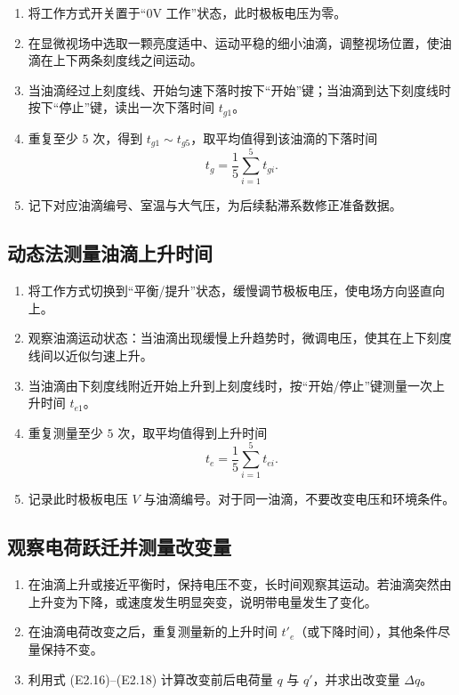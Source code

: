 \documentclass[a4paper,8pt,twocolumn]{article}
\begin{document}
\begin{enumerate}[label=\arabic*)]
  \item 将工作方式开关置于“0V 工作”状态，此时极板电压为零。
  \item 在显微视场中选取一颗亮度适中、运动平稳的细小油滴，调整视场位置，使油滴在上下两条刻度线之间运动。
  \item 当油滴经过上刻度线、开始匀速下落时按下“开始”键；当油滴到达下刻度线时按下“停止”键，读出一次下落时间 $t_{g1}$。
  \item 重复至少 $5$ 次，得到 $t_{g1}\sim t_{g5}$，取平均值得到该油滴的下落时间
  \[
    t_g=\frac{1}{5}\sum_{i=1}^{5}t_{gi}.
  \]
  \item 记下对应油滴编号、室温与大气压，为后续黏滞系数修正准备数据。
\end{enumerate}

\subsection{动态法测量油滴上升时间}

\begin{enumerate}[label=\arabic*)]
  \item 将工作方式切换到“平衡/提升”状态，缓慢调节极板电压，使电场方向竖直向上。
  \item 观察油滴运动状态：当油滴出现缓慢上升趋势时，微调电压，使其在上下刻度线间以近似匀速上升。
  \item 当油滴由下刻度线附近开始上升到上刻度线时，按“开始/停止”键测量一次上升时间 $t_{e1}$。
  \item 重复测量至少 $5$ 次，取平均值得到上升时间
  \[
    t_e=\frac{1}{5}\sum_{i=1}^{5}t_{ei}.
  \]
  \item 记录此时极板电压 $V$ 与油滴编号。对于同一油滴，不要改变电压和环境条件。
\end{enumerate}

\subsection{观察电荷跃迁并测量改变量}

\begin{enumerate}[label=\arabic*)]
  \item 在油滴上升或接近平衡时，保持电压不变，长时间观察其运动。若油滴突然由上升变为下降，或速度发生明显突变，说明带电量发生了变化。
  \item 在油滴电荷改变之后，重复测量新的上升时间 $t'_e$（或下降时间），其他条件尽量保持不变。
  \item 利用式 (E2.16)--(E2.18) 计算改变前后电荷量 $q$ 与 $q'$，并求出改变量 $\Delta q$。
\end{enumerate}
\end{document}
